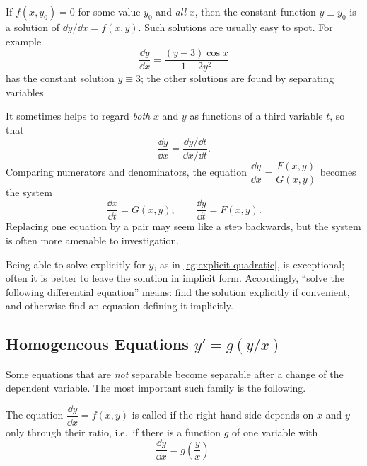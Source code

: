 \begin{note}
	If \(f(x, y_0) = 0\) for some value \(y_0\) and \emph{all} \(x\), then the constant
	function \(y \equiv y_0\) is a solution of \(\dd y/\dd x = f(x,y)\). Such solutions
	are usually easy to spot. For example
	\[
		\frac{\dd y}{\dd x} = \frac{(y-3)\cos x}{1 + 2y^2}
	\]
	has the constant solution \(y \equiv 3\); the other solutions are found by separating
	variables.
\end{note}

\begin{note}\label{note:parameter}
	It sometimes helps to regard \emph{both} \(x\) and \(y\) as functions of a third
	variable \(t\), so that
	\[
		\frac{\dd y}{\dd x} = \frac{\dd y/\dd t}{\dd x/\dd t}.
	\]
	Comparing numerators and denominators, the equation
	\(\dfrac{\dd y}{\dd x} = \dfrac{F(x,y)}{G(x,y)}\) becomes the system
	\[
		\frac{\dd x}{\dd t} = G(x,y), \qquad \frac{\dd y}{\dd t} = F(x,y).
	\]
	Replacing one equation by a pair may seem like a step backwards, but the system is
	often more amenable to investigation.
\end{note}

\begin{note}
	Being able to solve explicitly for \(y\), as in \autoref{eg:explicit-quadratic}, is
	exceptional; often it is better to leave the solution in implicit form. Accordingly,
	``solve the following differential equation'' means: find the solution explicitly if
	convenient, and otherwise find an equation defining it implicitly.
\end{note}

\subsection{Homogeneous Equations \texorpdfstring{\(y' = g(y/x)\)}{y' = g(y/x)}}


Some equations that are \emph{not} separable become separable after a change of the
dependent variable. The most important such family is the following.

\begin{definition}
	The equation \(\dfrac{\dd y}{\dd x} = f(x,y)\) is called  if the
	right-hand side depends on \(x\) and \(y\) only through their ratio, i.e.\ if there
	is a function \(g\) of one variable with
	\begin{equation}\label{eq:homog}
		\frac{\dd y}{\dd x} = g\!\left( \frac{y}{x} \right).
	\end{equation}
\end{definition}

